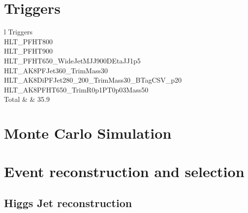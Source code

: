 \section{Triggers} \label{Triggers}

\begin{table}[h!]
  \begin{center}
    \begin{tabular}{l}
    Triggers \\
    \hline
    HLT_PFHT800\\
    HLT_PFHT900\\
    HLT_PFHT650_WideJetMJJ900DEtaJJ1p5\\
    HLT_AK8PFJet360_TrimMass30\\
    HLT_AK8DiPFJet280_200_TrimMass30_BTagCSV_p20\\
    HLT_AK8PFHT650_TrimR0p1PT0p03Mass50\\
    \hline
    Total & & 35.9\\
    \end{tabular}
  \end{center}

  \caption{List of Triggers applied in the analysis.}
\end{table} 

\section{Monte Carlo Simulation} \label{Monte Carlo Simulation}	

\section{Event reconstruction and selection} \label{Event reconstruction and selection}

\subsection{Higgs Jet reconstruction} 
	